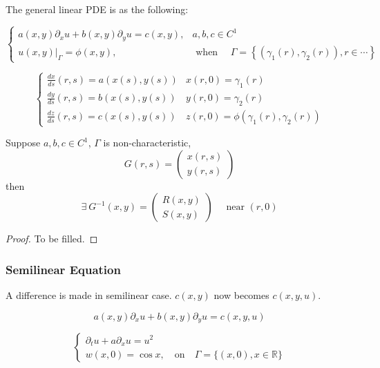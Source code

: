 The general linear PDE is as the following:

\begin{equation}
\left\{\begin{matrix}
a(x, y) \partial_{x} u+b(x, y) \partial_y u=c(x, y), &a, b, c \in C^{1} \\ 
\left.u(x, y)\right|_{\Gamma}=\phi(x, y), \quad &\text { when } \quad \Gamma=\left\{\left(\gamma_{1}(r), \gamma_{2}(r)\right), r \in \cdots\right\}
\end{matrix}\right.
\end{equation}

$$
\left\{\begin{array}{ll}{\frac{d x}{d s}(r,s)=a(x(s), y(s))}& x(r,0)=\gamma_1(r) \\
{\frac{d y}{d s}(r,s)=b(x(s), y(s))} & y(r,0)=\gamma_2(r) \\
{\frac{d z}{d s}(r,s)=c(x(s), y(s))} & z(r,0)=\phi(\gamma_1(r), \gamma_2(r)) \end{array}\right.
$$
\begin{lemma}
Suppose $a, b, c \in C^{1}$, $\Gamma$ is non-characteristic, 
$$
G(r, s)=\left(\begin{array}{l}{x(r, s)} \\ {y(r, s)}\end{array}\right)
$$
then
$$
\exists\ G^{-1}(x, y)=\left(\begin{array}{l}{R(x, y)} \\ {S(x, y)}\end{array}\right) \quad \text { near }(r, 0)
$$
\end{lemma}
\begin{proof}
To be filled.
\end{proof}
\subsubsection{Semilinear Equation}
A difference is made in semilinear case. $c(x,y)$ now becomes $c(x,y,u)$.

\begin{equation}
a(x, y) \partial_{x} u+b(x, y) \partial_y u=c(x, y,u)
\end{equation}

\begin{example}
$$
\left\{\begin{array}{l}{\partial_{t} u+a \partial_{x}u=u^{2}} \\ {w(x, 0)=\cos x, \quad \text{on}\quad \Gamma=\{(x, 0), x \in \mathbb{R}\}}\end{array}\right.
$$
\end{example}

